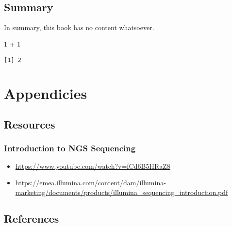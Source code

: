 \documentclass[
  letterpaper,
]{book}
\newenvironment{Shaded}{}{}
\newcommand{\DecValTok}[1]{\textcolor[rgb]{0.00,0.36,0.77}{#1}}
\newcommand{\SpecialCharTok}[1]{\textcolor[rgb]{0.00,0.36,0.77}{#1}}
\providecommand{\tightlist}{%
  \setlength{\itemsep}{0pt}\setlength{\parskip}{0pt}}\usepackage{longtable,booktabs,array}
\begin{document}

\hypertarget{summary-1}{%
\chapter*{Summary}\label{summary-1}}


In summary, this book has no content whatsoever.

\begin{Shaded}
\begin{Highlighting}[]
\DecValTok{1} \SpecialCharTok{+} \DecValTok{1}
\end{Highlighting}
\end{Shaded}

\begin{verbatim}
[1] 2
\end{verbatim}

\part{Appendicies}

\hypertarget{resources}{%
\chapter{Resources}\label{resources}}

\hypertarget{introduction-to-ngs-sequencing-2}{%
\section{Introduction to NGS
Sequencing}\label{introduction-to-ngs-sequencing-2}}

\begin{itemize}
\tightlist
\item
  \url{https://www.youtube.com/watch?v=fCd6B5HRaZ8}
\item
  \url{https://emea.illumina.com/content/dam/illumina-marketing/documents/products/illumina_sequencing_introduction.pdf}
\end{itemize}

\hypertarget{references}{%
\chapter*{References}\label{references}}

\end{document}
